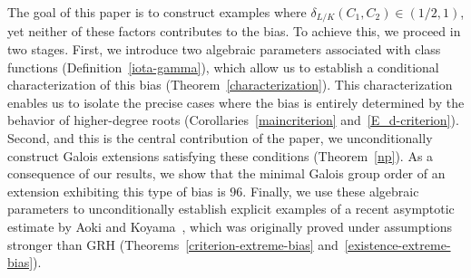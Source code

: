 \documentclass[12pt]{amsart}
\numberwithin{equation}{section}
\theoremstyle{definition}
\theoremstyle{remark}
\begin{document}
The goal of this paper is to construct examples where $\delta_{L/K}(C_1,C_2)\in (1/2,1)$, yet neither of these factors contributes to the bias. To achieve this, we proceed in two stages. First, we introduce two algebraic parameters associated with class functions (Definition~\ref{iota-gamma}), which allow us to establish a conditional characterization of this bias (Theorem~\ref{characterization}). This characterization enables us to isolate the precise cases where the bias is entirely determined by the behavior of higher-degree roots (Corollaries~\ref{maincriterion} and~\ref{E_d-criterion}). Second, and this is the central contribution of the paper, we unconditionally construct Galois extensions satisfying these conditions (Theorem~\ref{np}). As a consequence of our results, we show that the minimal Galois group order of an extension exhibiting this type of bias is $96$. Finally, we use these algebraic parameters to unconditionally establish explicit examples of a recent asymptotic estimate by Aoki and Koyama~\cite{Ao-Ko}, which was originally proved under assumptions stronger than $\mathrm{GRH}$ (Theorems~\ref{criterion-extreme-bias} and~\ref{existence-extreme-bias}).
\end{document}
